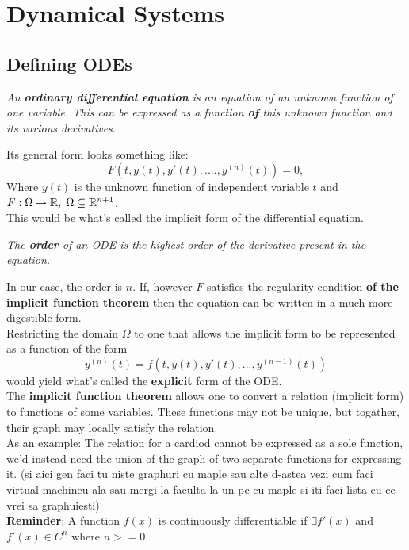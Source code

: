 \chapter{Dynamical Systems}
\label{chap:ch3}


\section{Defining ODEs}
\begin{definition}
    \textit{An \textbf{ordinary differential equation} is an equation of an unknown function of one variable. This can be expressed as a function \textbf{of} this unknown function and its various derivatives}.
\end{definition}
Its general form looks something like:
\begin{equation}\label{eq:3.1.1}
    F(t,y(t),y'(t),....,y^{(n)}(t))=0,
\end{equation}
Where $y(t)$ is the unknown function of independent variable $t$ and $F : \Omega \rightarrow \mathbb{R},\hspace{0.1cm}\Omega \subseteq \mathbb{R}^{n+1}$. \\
This would be what's called the implicit form of the differential equation.

\begin{definition}
    \textit{The \textbf{order} of an ODE is the highest order of the derivative present in the equation.}
\end{definition}
In our case, the order is $n$.
If, however $F$ satisfies the regularity condition \textbf{of the implicit function theorem} then the equation can be written in a much more digestible form. \\
Restricting the domain $\Omega$ to one that allows the implicit form to be represented as a function of the form
\begin{equation}\label{eq:3.1.2}
    y^{(n)}(t)=f(t,y(t),y'(t),...,y^{(n-1)}(t))
\end{equation}
would yield what's called the \textbf{explicit} form of the ODE. \\

The \textbf{implicit function theorem} allows one to convert a relation (implicit form) to functions of some variables. These functions may not be unique, but togather, their graph may locally satisfy the relation. \\
As an example: The relation for a cardiod cannot be expressed as a sole function, we'd instead need the union of the graph of two separate functions for expressing it.
(si aici gen faci tu niste graphuri cu maple sau alte d-astea vezi cum faci virtual machineu ala sau mergi la faculta la un pc cu maple si iti faci lista cu ce vrei sa graphuiesti) \\
\textbf{Reminder}: A function $f(x)$ is continuously differentiable if $\exists f'(x)$ and $f'(x) \in C^n$ where $n>=0$

